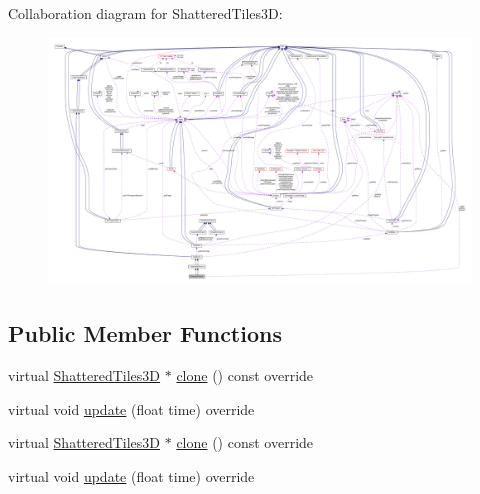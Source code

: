 Collaboration diagram for Shattered\+Tiles3D\+:
\nopagebreak
\begin{figure}[H]
\begin{center}
\leavevmode
\includegraphics[width=350pt]{classShatteredTiles3D__coll__graph}
\end{center}
\end{figure}
\subsection*{Public Member Functions}
\begin{DoxyCompactItemize}
\item 
virtual \hyperlink{classShatteredTiles3D}{Shattered\+Tiles3D} $\ast$ \hyperlink{classShatteredTiles3D_ae5b679ec020c8c3158c7b5c377d95c2f}{clone} () const override
\item 
virtual void \hyperlink{classShatteredTiles3D_a57e1d5d09bc2dce9a76828ccf50c1a09}{update} (float time) override
\item 
virtual \hyperlink{classShatteredTiles3D}{Shattered\+Tiles3D} $\ast$ \hyperlink{classShatteredTiles3D_a9612352337be5982ea8fa78bde1abf02}{clone} () const override
\item 
virtual void \hyperlink{classShatteredTiles3D_ad45d0298d3d697ef2c609bfc14b65eba}{update} (float time) override
\end{DoxyCompactItemize}
